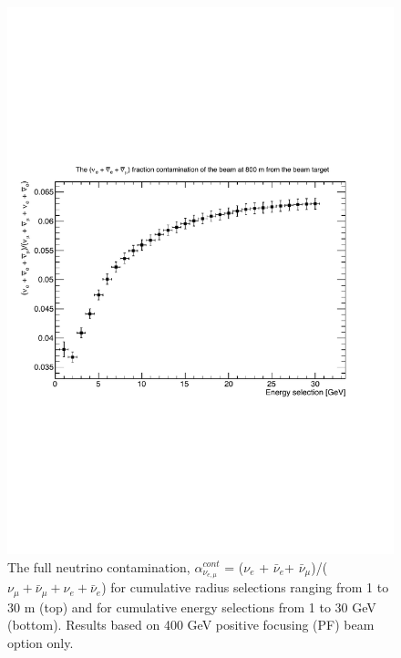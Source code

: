 \begin{figure}[htbp]
\begin{center}
 	\includegraphics[width=120mm]{Chapter3/figures/400GeV_PF_nueAndNueBarAndNumuBarRatio_EnergyCuts.pdf}
      \caption{The full neutrino contamination, $\alpha_{\nu_{e,\mu}}^{cont}$ = ($\nu_{e}$ + $\bar{\nu}_{e}$+ $\bar{\nu}_{\mu}$)/($\nu_{\mu} + \bar{\nu}_{\mu} + \nu_{e} + \bar{\nu}_{e}$) for cumulative radius selections ranging from 1 to 30 m (top) and for cumulative energy selections from 1 to 30 GeV (bottom). Results based on 400 GeV positive focusing (PF) beam option only.}
    \label{fig:nueAndNuMuBarContamination}
\end{center}
\end{figure}

